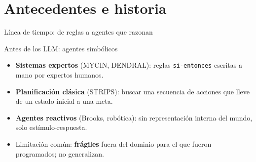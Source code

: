 \section{Antecedentes e historia}

\begin{frame}{Línea de tiempo: de reglas a agentes que razonan}
  \centering
\end{frame}

\begin{frame}{Antes de los LLM: agentes simbólicos}
  \begin{itemize}
    \item \textbf{Sistemas expertos} (MYCIN, DENDRAL): reglas \texttt{si-entonces}
      escritas a mano por expertos humanos.
    \item \textbf{Planificación clásica} (STRIPS): buscar una secuencia de
      acciones que lleve de un estado inicial a una meta.
    \item \textbf{Agentes reactivos} (Brooks, robótica): sin representación
      interna del mundo, solo estímulo-respuesta.
    \item Limitación común: \textbf{frágiles} fuera del dominio para el que
      fueron programados; no generalizan.
  \end{itemize}
\end{frame}

